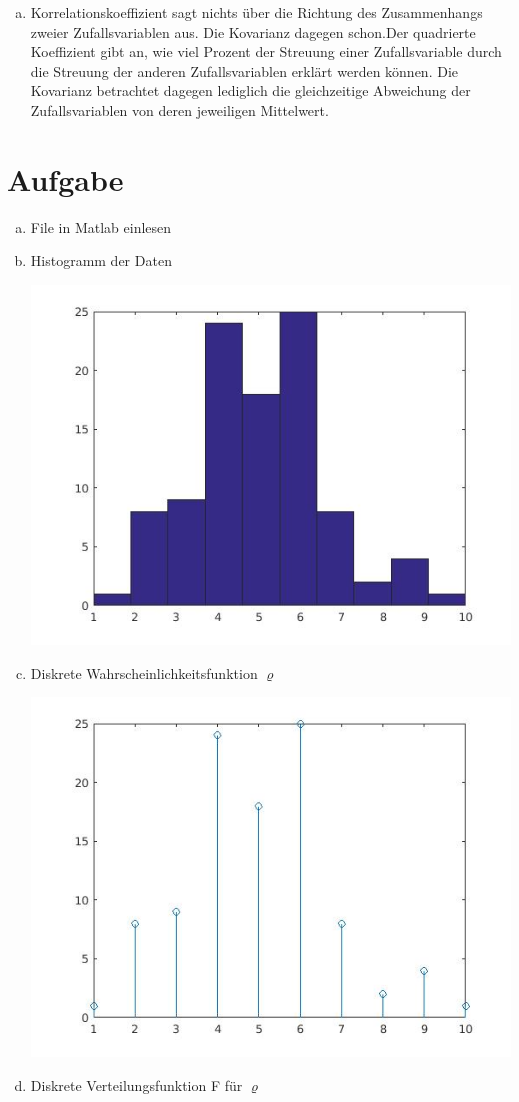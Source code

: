 \documentclass[a4paper]{scrartcl}
\begin{document}
\begin{enumerate}[a)]
	\item 
	Korrelationskoeffizient sagt nichts über die Richtung des Zusammenhangs zweier Zufallsvariablen aus. Die Kovarianz dagegen schon.Der quadrierte Koeffizient gibt an, wie viel Prozent der Streuung einer Zufallsvariable durch die Streuung der anderen Zufallsvariablen erklärt werden können. Die Kovarianz betrachtet dagegen lediglich die gleichzeitige Abweichung der Zufallsvariablen von deren jeweiligen Mittelwert.\\
	
\end{enumerate}
\newpage
\section{Aufgabe}

\begin{enumerate}[a)]
	\item File in Matlab einlesen
	\item Histogramm der Daten
	
		\includegraphics[width=.6\textwidth]{plots/4b.jpg}
	\item Diskrete Wahrscheinlichkeitsfunktion $\varrho$
	
		\includegraphics[width=.6\textwidth]{plots/4c.jpg}
	\item Diskrete Verteilungsfunktion F für $\varrho$
	

\end{enumerate}
\end{document}
